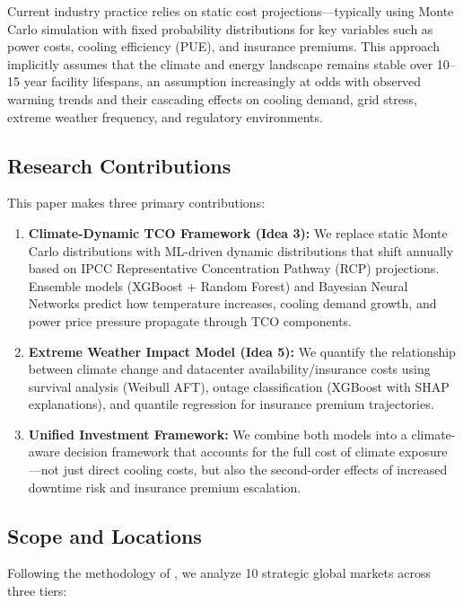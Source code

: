 \documentclass[12pt,a4paper]{article}
\begin{document}
Current industry practice relies on static cost projections—typically using Monte Carlo simulation with fixed probability distributions for key variables such as power costs, cooling efficiency (PUE), and insurance premiums. This approach implicitly assumes that the climate and energy landscape remains stable over 10--15 year facility lifespans, an assumption increasingly at odds with observed warming trends and their cascading effects on cooling demand, grid stress, extreme weather frequency, and regulatory environments.

\subsection{Research Contributions}

This paper makes three primary contributions:

\begin{enumerate}
    \item \textbf{Climate-Dynamic TCO Framework (Idea 3):} We replace static Monte Carlo distributions with ML-driven dynamic distributions that shift annually based on IPCC Representative Concentration Pathway (RCP) projections. Ensemble models (XGBoost + Random Forest) and Bayesian Neural Networks predict how temperature increases, cooling demand growth, and power price pressure propagate through TCO components.

    \item \textbf{Extreme Weather Impact Model (Idea 5):} We quantify the relationship between climate change and datacenter availability/insurance costs using survival analysis (Weibull AFT), outage classification (XGBoost with SHAP explanations), and quantile regression for insurance premium trajectories.

    \item \textbf{Unified Investment Framework:} We combine both models into a climate-aware decision framework that accounts for the full cost of climate exposure—not just direct cooling costs, but also the second-order effects of increased downtime risk and insurance premium escalation.
\end{enumerate}

\subsection{Scope and Locations}

Following the methodology of \citet{dccore2025}, we analyze 10 strategic global markets across three tiers:
\end{document}
